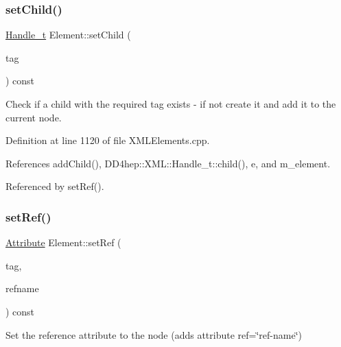 \subsubsection{\texorpdfstring{set\+Child()}{setChild()}}
{\footnotesize\ttfamily \hyperlink{class_d_d4hep_1_1_x_m_l_1_1_handle__t}{Handle\+\_\+t} Element\+::set\+Child (\begin{DoxyParamCaption}\item[{const \hyperlink{namespace_d_d4hep_1_1_x_m_l_a09e5d9cc86ed782f6826dfe0778c1815}{Xml\+Char} $\ast$}]{tag }\end{DoxyParamCaption}) const}



Check if a child with the required tag exists -\/ if not create it and add it to the current node. 



Definition at line 1120 of file X\+M\+L\+Elements.\+cpp.



References add\+Child(), D\+D4hep\+::\+X\+M\+L\+::\+Handle\+\_\+t\+::child(), e, and m\+\_\+element.



Referenced by set\+Ref().

\hypertarget{class_d_d4hep_1_1_x_m_l_1_1_element_a92194598196bdb19571df9c69e47e642}{}\label{class_d_d4hep_1_1_x_m_l_1_1_element_a92194598196bdb19571df9c69e47e642} 
\subsubsection{\texorpdfstring{set\+Ref()}{setRef()}\hspace{0.1cm}{\footnotesize\ttfamily [1/2]}}
{\footnotesize\ttfamily \hyperlink{namespace_d_d4hep_1_1_x_m_l_a5c19b7116be99d69b4b22d911357baaf}{Attribute} Element\+::set\+Ref (\begin{DoxyParamCaption}\item[{const \hyperlink{namespace_d_d4hep_1_1_x_m_l_a09e5d9cc86ed782f6826dfe0778c1815}{Xml\+Char} $\ast$}]{tag,  }\item[{const \hyperlink{namespace_d_d4hep_1_1_x_m_l_a09e5d9cc86ed782f6826dfe0778c1815}{Xml\+Char} $\ast$}]{refname }\end{DoxyParamCaption}) const}



Set the reference attribute to the node (adds attribute ref=\char`\"{}ref-\/name\char`\"{}) 



